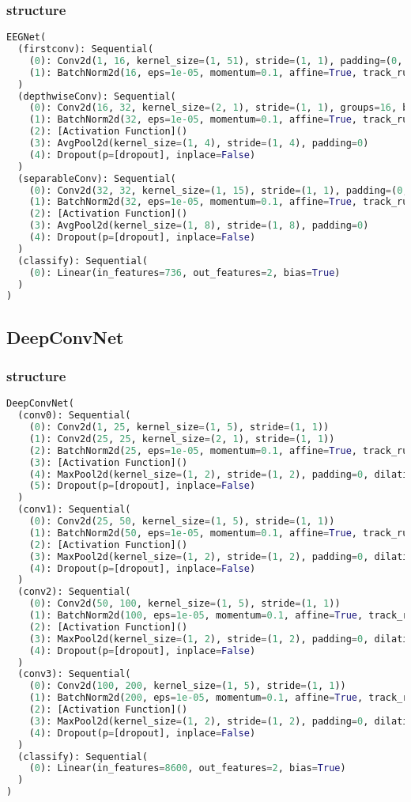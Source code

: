 \subsubsection{structure}
\begin{lstlisting}[language=Python]
EEGNet(
  (firstconv): Sequential(
    (0): Conv2d(1, 16, kernel_size=(1, 51), stride=(1, 1), padding=(0, 25), bias=False)
    (1): BatchNorm2d(16, eps=1e-05, momentum=0.1, affine=True, track_running_stats=True)
  )
  (depthwiseConv): Sequential(
    (0): Conv2d(16, 32, kernel_size=(2, 1), stride=(1, 1), groups=16, bias=False)
    (1): BatchNorm2d(32, eps=1e-05, momentum=0.1, affine=True, track_running_stats=True)
    (2): [Activation Function]()
    (3): AvgPool2d(kernel_size=(1, 4), stride=(1, 4), padding=0)
    (4): Dropout(p=[dropout], inplace=False)
  )
  (separableConv): Sequential(
    (0): Conv2d(32, 32, kernel_size=(1, 15), stride=(1, 1), padding=(0, 7), bias=False)
    (1): BatchNorm2d(32, eps=1e-05, momentum=0.1, affine=True, track_running_stats=True)
    (2): [Activation Function]()
    (3): AvgPool2d(kernel_size=(1, 8), stride=(1, 8), padding=0)
    (4): Dropout(p=[dropout], inplace=False)
  )
  (classify): Sequential(
    (0): Linear(in_features=736, out_features=2, bias=True)
  )
)
\end{lstlisting}
\subsection{DeepConvNet}
\subsubsection{structure}
\begin{lstlisting}[language=Python]
DeepConvNet(
  (conv0): Sequential(
    (0): Conv2d(1, 25, kernel_size=(1, 5), stride=(1, 1))
    (1): Conv2d(25, 25, kernel_size=(2, 1), stride=(1, 1))
    (2): BatchNorm2d(25, eps=1e-05, momentum=0.1, affine=True, track_running_stats=True)
    (3): [Activation Function]()
    (4): MaxPool2d(kernel_size=(1, 2), stride=(1, 2), padding=0, dilation=1, ceil_mode=False)
    (5): Dropout(p=[dropout], inplace=False)
  )
  (conv1): Sequential(
    (0): Conv2d(25, 50, kernel_size=(1, 5), stride=(1, 1))
    (1): BatchNorm2d(50, eps=1e-05, momentum=0.1, affine=True, track_running_stats=True)
    (2): [Activation Function]()
    (3): MaxPool2d(kernel_size=(1, 2), stride=(1, 2), padding=0, dilation=1, ceil_mode=False)
    (4): Dropout(p=[dropout], inplace=False)
  )
  (conv2): Sequential(
    (0): Conv2d(50, 100, kernel_size=(1, 5), stride=(1, 1))
    (1): BatchNorm2d(100, eps=1e-05, momentum=0.1, affine=True, track_running_stats=True)
    (2): [Activation Function]()
    (3): MaxPool2d(kernel_size=(1, 2), stride=(1, 2), padding=0, dilation=1, ceil_mode=False)
    (4): Dropout(p=[dropout], inplace=False)
  )
  (conv3): Sequential(
    (0): Conv2d(100, 200, kernel_size=(1, 5), stride=(1, 1))
    (1): BatchNorm2d(200, eps=1e-05, momentum=0.1, affine=True, track_running_stats=True)
    (2): [Activation Function]()
    (3): MaxPool2d(kernel_size=(1, 2), stride=(1, 2), padding=0, dilation=1, ceil_mode=False)
    (4): Dropout(p=[dropout], inplace=False)
  )
  (classify): Sequential(
    (0): Linear(in_features=8600, out_features=2, bias=True)
  )
)
\end{lstlisting}
